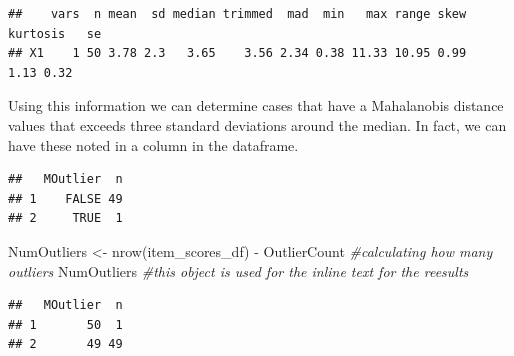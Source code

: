 \documentclass[
  11pt,
]{book}
\newenvironment{Shaded}{\begin{snugshade}}{\end{snugshade}}
\newcommand{\CommentTok}[1]{\textcolor[rgb]{0.56,0.35,0.01}{\textit{#1}}}
\newcommand{\ConstantTok}[1]{\textcolor[rgb]{0.00,0.00,0.00}{#1}}
\newcommand{\DecValTok}[1]{\textcolor[rgb]{0.00,0.00,0.81}{#1}}
\newcommand{\FunctionTok}[1]{\textcolor[rgb]{0.00,0.00,0.00}{#1}}
\newcommand{\NormalTok}[1]{#1}
\newcommand{\OtherTok}[1]{\textcolor[rgb]{0.56,0.35,0.01}{#1}}
\newcommand{\SpecialCharTok}[1]{\textcolor[rgb]{0.00,0.00,0.00}{#1}}
\begin{document}
\begin{verbatim}
##    vars  n mean  sd median trimmed  mad  min   max range skew kurtosis   se
## X1    1 50 3.78 2.3   3.65    3.56 2.34 0.38 11.33 10.95 0.99     1.13 0.32
\end{verbatim}

Using this information we can determine cases that have a Mahalanobis distance values that exceeds three standard deviations around the median. In fact, we can have these noted in a column in the dataframe.

\begin{Shaded}
\end{Shaded}

\begin{verbatim}
##   MOutlier  n
## 1    FALSE 49
## 2     TRUE  1
\end{verbatim}

\begin{Shaded}
\begin{Highlighting}[]
\NormalTok{NumOutliers }\OtherTok{\textless{}{-}} \FunctionTok{nrow}\NormalTok{(item\_scores\_df) }\SpecialCharTok{{-}}\NormalTok{ OutlierCount }\CommentTok{\#calculating how many outliers}
\NormalTok{NumOutliers }\CommentTok{\#this object is used for the inline text for the reesults}
\end{Highlighting}
\end{Shaded}

\begin{verbatim}
##   MOutlier  n
## 1       50  1
## 2       49 49
\end{verbatim}
\end{document}
